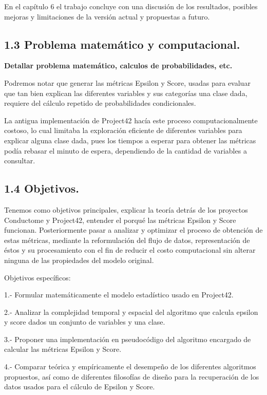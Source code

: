 \documentclass[
 12pt,
 letterpaper,
]{article}
\theoremstyle{teoremaBreak}
\theoremstyle{plain}
\theoremstyle{definition}
\begin{document}
En el capítulo 6 el trabajo concluye con una discusión de los
resultados, posibles mejoras y limitaciones de la versión actual y
propuestas a futuro.

\subsection{1.3 Problema matemático y
computacional.}\label{problema-matemuxe1tico-y-computacional.}

\textbf{Detallar problema matemático, calculos de probabilidades, etc.}

Podremos notar que generar las métricas Epsilon y Score, usadas para
evaluar que tan bien explican las diferentes variables y sus categorías
una clase dada, requiere del cálculo repetido de probabilidades
condicionales.

La antigua implementación de Project42 hacía este proceso
computacionalmente costoso, lo cual limitaba la exploración eficiente de
diferentes variables para explicar alguna clase dada, pues los tiempos a
esperar para obtener las métricas podía rebasar el minuto de espera,
dependiendo de la cantidad de variables a consultar.

\subsection{1.4 Objetivos.}\label{objetivos.}

Tenemos como objetivos principales, explicar la teoría detrás de los
proyectos Conductome y Project42, entender el porqué las métricas
Epsilon y Score funcionan. Posteriormente pasar a analizar y optimizar
el proceso de obtención de estas métricas, mediante la reformulación del
flujo de datos, representación de éstos y su procesamiento con el fin de
reducir el costo computacional sin alterar ninguna de las propiedades
del modelo original.

Objetivos específicos:

1.- Formular matemáticamente el modelo estadístico usado en Project42.

2.- Analizar la complejidad temporal y espacial del algoritmo que
calcula epsilon y score dados un conjunto de variables y una clase.

3.- Proponer una implementación en pseudocódigo del algoritmo encargado
de calcular las métricas Epsilon y Score.

4.- Comparar teórica y empíricamente el desempeño de los diferentes
algoritmos propuestos, así como de diferentes filosofías de diseño para
la recuperación de los datos usados para el cálculo de Epsilon y Score.
\end{document}

